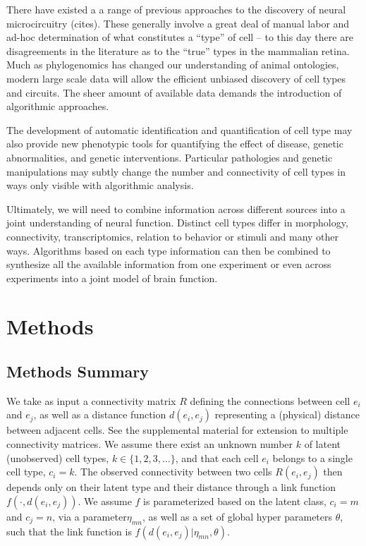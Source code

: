 \documentclass{article}
\begin{document}
There have existed a a range of previous approaches to the discovery
of neural microcircuitry (cites). These generally involve a great deal
of manual labor and ad-hoc determination of what constitutes a “type”
of cell -- to this day there are disagreements in the literature as to
the “true” types in the mammalian retina. Much as phylogenomics has
changed our understanding of animal ontologies, modern large scale
data will allow the efficient unbiased discovery of cell types and
circuits. The sheer amount of available data demands the introduction
of algorithmic approaches.

The development of automatic identification and quantification of cell
type may also provide new phenotypic tools for quantifying the effect
of disease, genetic abnormalities, and genetic
interventions. Particular pathologies and genetic manipulations may
subtly change the number and connectivity of cell types in ways
only visible with algorithmic analysis. 

Ultimately, we will need to combine information across different
sources into a joint understanding of neural function. Distinct cell
types differ in morphology, connectivity, transcriptomics, relation to
behavior or stimuli and many other ways. Algorithms based on each type
information can then be combined to synthesize all the available
information from one experiment or even across experiments into a
joint model of brain function.

\newpage
\section{Methods }
\subsection{Methods Summary}

We take as input a connectivity matrix $R$ defining the connections
between cell $e_i$ and $e_j$, as well as a distance function $d(e_i, e_j)$
representing a (physical) distance between adjacent cells. See the
supplemental material for extension to multiple connectivity
matrices. We assume there exist an unknown number $k$ of latent
(unobserved) cell types, $k \in \{1, 2, 3, \dots\}$, and that
each cell $e_i$ belongs to a single cell type, $c_i = k$. The observed
connectivity between two cells $R(e_i, e_j)$ then depends only on
their latent type and their distance through a link function $f(\cdot, d(e_i, e_j))$. We assume $f$ is parameterized based on the latent class, $c_i=m$ and $c_j=n$, via a parameter$\eta_{mn}$, as well as a set of global hyper parameters $\theta$, such that the link function is $f(d(e_i, e_j) | \eta_{mn}, \theta)$. 
\end{document}
